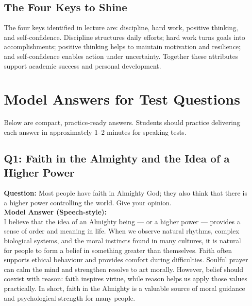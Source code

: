 \documentclass[a4paper,12pt]{article}
\begin{document}
\subsection*{The Four Keys to Shine}
The four keys identified in lecture are: discipline, hard work, positive thinking, and self-confidence. Discipline structures daily efforts; hard work turns goals into accomplishments; positive thinking helps to maintain motivation and resilience; and self-confidence enables action under uncertainty. Together these attributes support academic success and personal development.

\section*{Model Answers for Test Questions}
Below are compact, practice-ready answers. Students should practice delivering each answer in approximately 1--2 minutes for speaking tests.

\subsection*{Q1: Faith in the Almighty and the Idea of a Higher Power}
\textbf{Question:} Most people have faith in Almighty God; they also think that there is a higher power controlling the world. Give your opinion.\\
\textbf{Model Answer (Speech-style):}\\
I believe that the idea of an Almighty being — or a higher power — provides a sense of order and meaning in life. When we observe natural rhythms, complex biological systems, and the moral instincts found in many cultures, it is natural for people to form a belief in something greater than themselves. Faith often supports ethical behaviour and provides comfort during difficulties. Soulful prayer can calm the mind and strengthen resolve to act morally. However, belief should coexist with reason: faith inspires virtue, while reason helps us apply those values practically. In short, faith in the Almighty is a valuable source of moral guidance and psychological strength for many people.
\end{document}
